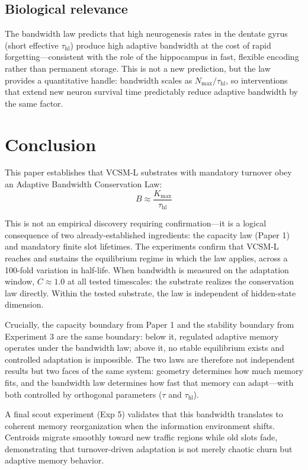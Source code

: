 \documentclass[11pt]{article}
\begin{document}
\subsection{Biological relevance}

The bandwidth law predicts that high neurogenesis rates in the dentate gyrus (short effective
$\tau_{\text{hl}}$) produce high adaptive bandwidth at the cost of rapid forgetting---consistent
with the role of the hippocampus in fast, flexible encoding rather than permanent storage.
This is not a new prediction, but the law provides a quantitative handle: bandwidth scales
as $N_{\max}/\tau_{\text{hl}}$, so interventions that extend new neuron survival time
predictably reduce adaptive bandwidth by the same factor.

\section{Conclusion}

This paper establishes that VCSM-L substrates with mandatory turnover obey an Adaptive Bandwidth Conservation Law:
\[
  B \approx \frac{K_{\max}}{\tau_{\text{hl}}}
\]

This is not an empirical discovery requiring confirmation---it is a logical consequence of two already-established ingredients: the capacity law (Paper 1) and mandatory finite slot lifetimes. The experiments confirm that VCSM-L reaches and sustains the equilibrium regime in which the law applies, across a 100-fold variation in half-life. When bandwidth is measured on the adaptation window, $C \approx 1.0$ at all tested timescales: the substrate realizes the conservation law directly. Within the tested substrate, the law is independent of hidden-state dimension.

Crucially, the capacity boundary from Paper 1 and the stability boundary from Experiment 3 are the same boundary: below it, regulated adaptive memory operates under the bandwidth law; above it, no stable equilibrium exists and controlled adaptation is impossible. The two laws are therefore not independent results but two faces of the same system: geometry determines how much memory fits, and the bandwidth law determines how fast that memory can adapt---with both controlled by orthogonal parameters ($\tau$ and $\tau_{\text{hl}}$).

A final scout experiment (Exp 5) validates that this bandwidth translates to coherent memory reorganization when the information environment shifts. Centroids migrate smoothly toward new traffic regions while old slots fade, demonstrating that turnover-driven adaptation is not merely chaotic churn but adaptive memory behavior.
\end{document}

